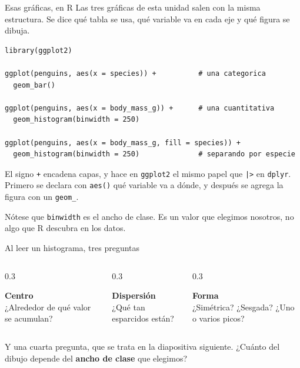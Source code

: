 \documentclass[aspectratio=169,10pt]{beamer}
\newcommand{\Rc}[1]{{\setlength{\fboxsep}{1.6pt}%
  \colorbox{codigoFondo}{\textcolor{codigoTexto}{\texttt{#1}}}}}
\newcommand{\destaca}[1]{%
  \par\vspace{3pt}\noindent
  \colorbox{azulClaro}{%
    \parbox{\dimexpr\linewidth-2\fboxsep\relax}{\vspace{3pt}#1\vspace{3pt}}}%
  \par\vspace{3pt}}
\begin{document}
\begin{frame}[fragile]{Esas gráficas, en R}
  Las tres gráficas de esta unidad salen con la misma estructura. Se dice qué tabla se
  usa, qué variable va en cada eje y qué figura se dibuja.

\begin{lstlisting}
library(ggplot2)

ggplot(penguins, aes(x = species)) +          # una categorica
  geom_bar()

ggplot(penguins, aes(x = body_mass_g)) +      # una cuantitativa
  geom_histogram(binwidth = 250)

ggplot(penguins, aes(x = body_mass_g, fill = species)) +
  geom_histogram(binwidth = 250)              # separando por especie
\end{lstlisting}

  \vspace{0.2cm}
  \destaca{\small El signo \Rc{+} encadena capas, y hace en \texttt{ggplot2} el mismo
  papel que \Rc{|>} en \texttt{dplyr}. Primero se declara con \Rc{aes()} qué variable va
  a dónde, y después se agrega la figura con un \Rc{geom\_}.

  \vspace{0.15cm}
  Nótese que \Rc{binwidth} es el ancho de clase. Es un valor que elegimos nosotros, no
  algo que R descubra en los datos.}
\end{frame}
\begin{frame}{Al leer un histograma, tres preguntas}
  \begin{columns}[T]
    \begin{column}{0.3\textwidth}
      \destaca{\centering\textbf{Centro}\\[3pt]{\small ¿Alrededor de qué valor se acumulan?}}
    \end{column}
    \begin{column}{0.3\textwidth}
      \destaca{\centering\textbf{Dispersión}\\[3pt]{\small ¿Qué tan esparcidos están?}}
    \end{column}
    \begin{column}{0.3\textwidth}
      \destaca{\centering\textbf{Forma}\\[3pt]{\small ¿Simétrica? ¿Sesgada? ¿Uno o varios picos?}}
    \end{column}
  \end{columns}

  \vspace{0.8cm}
  \destaca{Y una cuarta pregunta, que se trata en la diapositiva siguiente. ¿Cuánto
  del dibujo depende del \textbf{ancho de clase} que elegimos?}
\end{frame}
\end{document}
